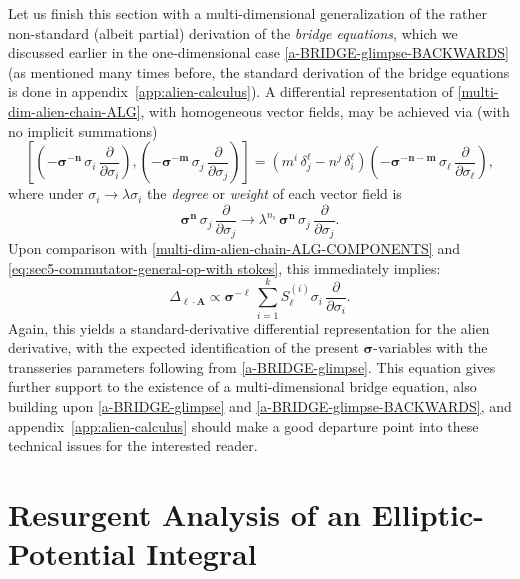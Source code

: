 \documentclass[11pt,a4paper]{article}
\newcommand{\be}{\begin{equation}}
\newcommand{\ee}{\end{equation}}
\begin{document}
Let us finish this section with a multi-dimensional generalization of the rather non-standard (albeit partial) derivation of the \textit{bridge equations}, which we discussed earlier in the one-dimensional case \eqref{a-BRIDGE-glimpse-BACKWARDS} (as mentioned many times before, the standard derivation of the bridge equations is done in appendix~\ref{app:alien-calculus}). A differential representation of \eqref{multi-dim-alien-chain-ALG}, with homogeneous vector fields, may be achieved via (with no implicit summations)
%
\be
\left[ \left( - \boldsymbol{\sigma}^{-\boldsymbol{n}}\, \sigma_i\, \frac{\partial}{\partial\sigma_i} \right), \left( - \boldsymbol{\sigma}^{-\boldsymbol{m}}\, \sigma_j\, \frac{\partial}{\partial\sigma_j} \right) \right] = \left( m^i\, \delta_j^{\ell} - n^j\, \delta_i^{\ell} \right) \left( -\boldsymbol{\sigma}^{-\boldsymbol{n}-\boldsymbol{m}}\, \sigma_{\ell}\, \frac{\partial}{\partial\sigma_{\ell}} \right),
\ee
%
\noindent
where under $\sigma_i \to \lambda \sigma_i$ the \textit{degree} or \textit{weight} of each vector field is
%
\be
\boldsymbol{\sigma}^{\boldsymbol{n}}\, \sigma_j\, \frac{\partial}{\partial\sigma_j} \to \lambda^{n_i}\, \boldsymbol{\sigma}^{\boldsymbol{n}}\, \sigma_j\, \frac{\partial}{\partial\sigma_j}.
\ee
%
\noindent
Upon comparison with \eqref{multi-dim-alien-chain-ALG-COMPONENTS} and \eqref{eq:sec5-commutator-general-op-with stokes}, this immediately implies:
%
\be
\Delta_{\boldsymbol{\ell}\cdot\boldsymbol{A}} \propto \boldsymbol{\sigma}^{-\boldsymbol{\ell}}\, \sum_{i=1}^{k} S_{\boldsymbol{\ell}}^{(i)}  \sigma_i\, \frac{\partial}{\partial\sigma_i}.
\ee
%
\noindent
Again, this yields a standard-derivative differential representation for the alien derivative, with the expected identification of the present $\boldsymbol{\sigma}$-variables with the transseries parameters following from \eqref{a-BRIDGE-glimpse}. This equation gives further support to the existence of a multi-dimensional bridge equation, also building upon \eqref{a-BRIDGE-glimpse} and \eqref{a-BRIDGE-glimpse-BACKWARDS}, and appendix~\ref{app:alien-calculus} should make a good departure point into these technical issues for the interested reader.


\section{Resurgent Analysis of an Elliptic-Potential Integral}\label{sec:elliptic}
\end{document}
